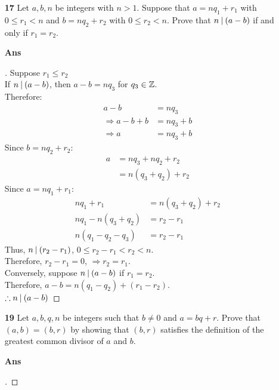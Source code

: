 \documentclass[paper=usletter, fontsize=12pt]{article}
\begin{document}
\begin{itemize}
\begin{itemize}
            \item[\textbf{17}] Let $a, b, n$ be integers with $n > 1$.
            Suppose that $a = nq_1 + r_1$ with $0 \le r_1 < n$ and $b =
            nq_2 + r_2$ with $0 \le r_2 < n$. Prove that $n \:\vert\: (a - b)$
            if and only if $r_1 = r_2$.
            \item[\textbf{Ans}]
            \begin{proof}[\unskip\nopunct]
                Suppose $r_1 \le r_2$ \\
                If $n \:\vert\: (a - b)$, then $a - b = nq_3$ for $q_3 \in
                \mathbb{Z}$. \\
                Therefore:
                \begin{align*}
                    a - b & = nq_3 \\
                    \Rightarrow a - b + b & = nq_3 + b \\
                    \Rightarrow a & = nq_3 + b
                \end{align*}
                Since $b = nq_2 + r_2$:
                \begin{align*}
                    a & = nq_3 + nq_2 + r_2 \\
                    & = n(q_3 + q_2) + r_2
                \end{align*}
                Since $a = nq_1 + r_1$:
                \begin{align*}
                    nq_1 + r_1 & = n(q_3 + q_2) + r_2 \\
                    nq_1 - n(q_3 + q_2) & = r_2 - r_1 \\
                    n(q_1 - q_2 - q_3) & = r_2 - r_1
                \end{align*}
                Thus, $n \:\vert\: (r_2 - r_1)$, $0 \le r_2 - r_1 < r_2 < n$.
                \\
                Therefore, $r_2 - r_1 = 0$, $\Rightarrow r_2 = r_1$. \\
                Conversely, suppose $n \:\vert\: (a - b)$ if $r_1 = r_2$. \\
                Therefore, $a - b = n(q_1 - q_2) + (r_1 - r_2)$. \\
                $\therefore n \:\vert\: (a-b)$ \qedhere
            \end{proof}
            \vspace{0.2in}

            \item[\textbf{19}] Let $a, b, q, n$ be integers such that $b
            \ne 0$ and $a = bq + r$. Prove that $(a, b) = (b, r)$ by
            showing that $(b, r)$ satisfies the definition of the greatest
            common divisor of $a$ and $b$.
            \item[\textbf{Ans}]
            \begin{proof}[\unskip\nopunct]
            \end{proof}
            \vspace{0.2in}

        \end{itemize}

    \end{itemize}
\end{document}
